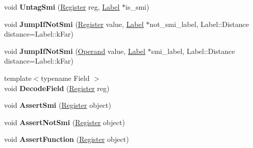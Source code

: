 \begin{DoxyCompactItemize}
void {\bfseries Untag\+Smi} (\mbox{\hyperlink{classv8_1_1internal_1_1Register}{Register}} reg, \mbox{\hyperlink{classv8_1_1internal_1_1Label}{Label}} $\ast$is\+\_\+smi)
\item 
\mbox{\label{classv8_1_1internal_1_1MacroAssembler_a7887fa1670e80524d74ed46fb055bb6a}} 
void {\bfseries Jump\+If\+Not\+Smi} (\mbox{\hyperlink{classv8_1_1internal_1_1Register}{Register}} value, \mbox{\hyperlink{classv8_1_1internal_1_1Label}{Label}} $\ast$not\+\_\+smi\+\_\+label, Label\+::\+Distance distance=Label\+::k\+Far)
\item 
\mbox{\label{classv8_1_1internal_1_1MacroAssembler_a8e1322a8cbe4a459e878b2cf997f66f3}} 
void {\bfseries Jump\+If\+Not\+Smi} (\mbox{\hyperlink{classv8_1_1internal_1_1Operand}{Operand}} value, \mbox{\hyperlink{classv8_1_1internal_1_1Label}{Label}} $\ast$smi\+\_\+label, Label\+::\+Distance distance=Label\+::k\+Far)
\item 
\mbox{\label{classv8_1_1internal_1_1MacroAssembler_a132efbdb5d6abe37ed26edc851c715f0}} 
{\footnotesize template$<$typename Field $>$ }\\void {\bfseries Decode\+Field} (\mbox{\hyperlink{classv8_1_1internal_1_1Register}{Register}} reg)
\item 
\mbox{\label{classv8_1_1internal_1_1MacroAssembler_aca8963bd0a98454d6ad0e4aa34d8cab8}} 
void {\bfseries Assert\+Smi} (\mbox{\hyperlink{classv8_1_1internal_1_1Register}{Register}} object)
\item 
\mbox{\label{classv8_1_1internal_1_1MacroAssembler_af70fc3cc2353f24bf73f868930906bcc}} 
void {\bfseries Assert\+Not\+Smi} (\mbox{\hyperlink{classv8_1_1internal_1_1Register}{Register}} object)
\item 
\mbox{\label{classv8_1_1internal_1_1MacroAssembler_aa8d13935f0543f10e23d7b44595f48bb}} 
void {\bfseries Assert\+Function} (\mbox{\hyperlink{classv8_1_1internal_1_1Register}{Register}} object)
\item 
\mbox{\label{classv8_1_1internal_1_1MacroAssembler_a6a0f31c1173192d0ff1e325d711e099f}} 

\end{DoxyCompactItemize}
